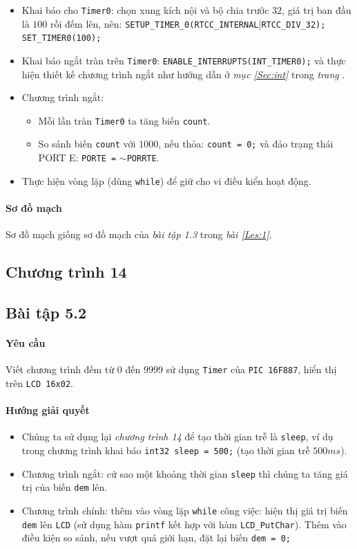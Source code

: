 \begin{itemize}
\item Khai báo cho \verb|Timer0|: chọn xung kích nội và bộ chia trước $32$, giá trị ban đầu là $100$ rồi đếm lên, nên: \verb|SETUP_TIMER_0(RTCC_INTERNAL|$|$\verb|RTCC_DIV_32);| \verb|SET_TIMER0(100);|
\item Khai báo ngắt tràn trên \verb|Timer0|: \verb|ENABLE_INTERRUPTS(INT_TIMER0);| và thực hiện thiết kế chương trình ngắt như hướng dẫn ở \emph{mục \ref{Sec:int}} trong \emph{trang \pageref{Sec:int}}.
\item Chương trình ngắt: 
\begin{itemize}
\item Mỗi lần tràn \verb|Timer0| ta tăng biến \verb|count|.
\item So sánh biến \verb|count| với $1000$, nếu thỏa: \verb|count = 0;| và đảo trạng thái PORT E: \verb|PORTE =| $\sim$\verb|PORRTE|.
\end{itemize}
\item Thực hiện vòng lặp (dùng \verb|while|) để giữ cho vi điều kiển hoạt động.
\end{itemize}
\paragraph*{Sơ đồ mạch} Sơ đồ mạch giống sơ đồ mạch của \emph{bài tập 1.3} trong \emph{bài \ref{Les:1}}.
\subsection*{Chương trình 14}

\subsection{Bài tập 5.2}
\paragraph{Yêu cầu}Viết chương trình đếm từ $0$ đến $9999$ sử dụng \verb|Timer| của \verb|PIC 16F887|, hiển thị trên \verb|LCD 16x02|.
\paragraph{Hướng giải quyết}
\begin{itemize}
\item Chúng ta sử dụng lại \emph{chương trình 14} để tạo thời gian trễ là \verb|sleep|, ví dụ trong chương trình khai báo \verb|int32 sleep = 500;| (tạo thời gian trễ $500ms$).
\item Chương trình ngắt: cứ sao một khoảng thời gian \verb|sleep| thì chúng ta tăng giá trị của biến \verb|dem| lên.
\item Chương trình chính: thêm vào vòng lặp \verb|while| công việc: hiện thị giá trị biến \verb|dem| lên \verb|LCD| (sử dụng hàm \verb|printf| kết hợp với hàm \verb|LCD_PutChar|). Thêm vào điều kiện so sánh, nếu vượt quá giới hạn, đặt lại biến \verb|dem = 0;|
\end{itemize}

